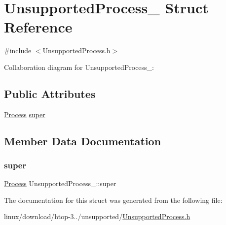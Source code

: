 \hypertarget{structUnsupportedProcess__}{}\section{Unsupported\+Process\+\_\+ Struct Reference}
\label{structUnsupportedProcess__}


{\ttfamily \#include $<$Unsupported\+Process.\+h$>$}



Collaboration diagram for Unsupported\+Process\+\_\+\+:
\subsection*{Public Attributes}
\begin{DoxyCompactItemize}
\item 
\hyperlink{Process_8h_a20673e8fa40981a168bf0e196c4cef3b}{Process} \hyperlink{structUnsupportedProcess___aed7da4cb1fd8478c6846e6251c35fe70}{super}
\end{DoxyCompactItemize}


\subsection{Member Data Documentation}
\mbox{\label{structUnsupportedProcess___aed7da4cb1fd8478c6846e6251c35fe70}} 
\subsubsection{\texorpdfstring{super}{super}}
{\footnotesize\ttfamily \hyperlink{Process_8h_a20673e8fa40981a168bf0e196c4cef3b}{Process} Unsupported\+Process\+\_\+\+::super}



The documentation for this struct was generated from the following file\+:\begin{DoxyCompactItemize}
\item 
linux/download/htop-\/3../unsupported/\hyperlink{UnsupportedProcess_8h}{Unsupported\+Process.\+h}\end{DoxyCompactItemize}
